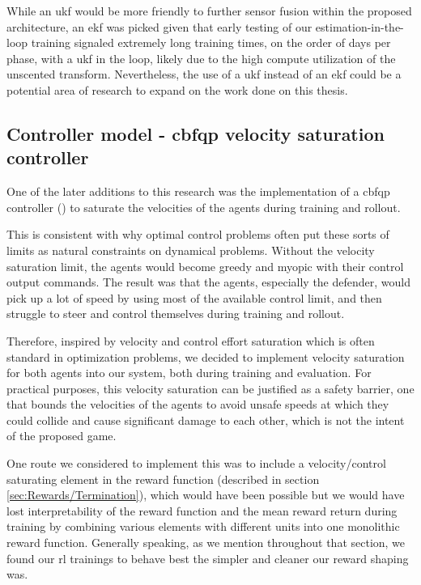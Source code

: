 While an \acs{ukf} would be more friendly to further sensor fusion within the proposed architecture, an \acs{ekf} was picked given that early testing of our estimation-in-the-loop training signaled extremely long training times, on the order of days per phase, with a \acs{ukf} in the loop, likely due to the high compute utilization of the unscented transform. Nevertheless, the use of a \acs{ukf} instead of an \acs{ekf} could be a potential area of research to expand on the work done on this thesis.


\subsection{Controller model - \acs{cbfqp} velocity saturation controller}
\label{sec:controller-model-cbf-qp}

One of the later additions to this research was the implementation of a \acs{cbfqp} controller (\cite{ames2017control}) to saturate the velocities of the agents during training and rollout.

This is consistent with why optimal control problems often put these sorts of limits as natural constraints on dynamical problems. Without the velocity saturation limit, the agents would become greedy and myopic with their control output commands. The result was that the agents, especially the defender, would pick up a lot of speed by using most of the available control limit, and then struggle to steer and control themselves during training and rollout.

Therefore, inspired by velocity and control effort saturation which is often standard in optimization problems, we decided to implement velocity saturation for both agents into our system, both during training and evaluation. For practical purposes, this velocity saturation can be justified as a safety barrier, one that bounds the velocities of the agents to avoid unsafe speeds at which they could collide and cause significant damage to each other, which is not the intent of the proposed game.

One route we considered to implement this was to include a velocity/control saturating element in the reward function (described in section \ref{sec:Rewards/Termination}), which would have been possible but we would have lost interpretability of the reward function and the mean reward return during training by combining various elements with different units into one monolithic reward function. Generally speaking, as we mention throughout that section, we found our \acs{rl} trainings to behave best the simpler and cleaner our reward shaping was.

